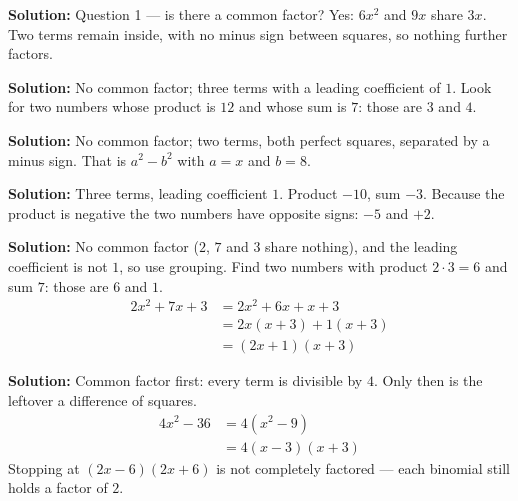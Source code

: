 \documentclass[12pt]{article}
\begin{document}




\textbf{Solution:} Question 1 --- is there a common factor? Yes: $6x^2$ and $9x$ share $3x$. Two terms remain inside, with no minus sign between squares, so nothing further factors. 


\textbf{Solution:} No common factor; three terms with a leading coefficient of $1$. Look for two numbers whose product is $12$ and whose sum is $7$: those are $3$ and $4$. 


\textbf{Solution:} No common factor; two terms, both perfect squares, separated by a minus sign. That is $a^2 - b^2$ with $a = x$ and $b = 8$. 


\textbf{Solution:} Three terms, leading coefficient $1$. Product $-10$, sum $-3$. Because the product is negative the two numbers have opposite signs: $-5$ and $+2$. 


\textbf{Solution:} No common factor ($2$, $7$ and $3$ share nothing), and the leading coefficient is not $1$, so use grouping. Find two numbers with product $2 \cdot 3 = 6$ and sum $7$: those are $6$ and $1$.
\begin{align*}
  2x^2 + 7x + 3 &= 2x^2 + 6x + x + 3 \\
                &= 2x(x+3) + 1(x+3) \\
                &= (2x+1)(x+3)
\end{align*}


\textbf{Solution:} Common factor first: every term is divisible by $4$. Only then is the leftover a difference of squares.
\begin{align*}
  4x^2 - 36 &= 4(x^2 - 9) \\
            &= 4(x-3)(x+3)
\end{align*}
Stopping at $(2x-6)(2x+6)$ is not completely factored --- each binomial still holds a factor of $2$. 
\end{document}
